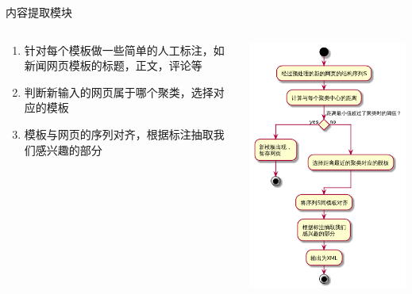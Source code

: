 \documentclass[presentation]{beamer}
\begin{document}
\begin{frame}[label=sec-2-23]{内容提取模块}
\begin{columns}
\begin{column}{0.55\textwidth}
\begin{enumerate}
\item 针对每个模板做一些简单的人工标注，如新闻网页模板的标题，正文，评论等
\item 判断新输入的网页属于哪个聚类，选择对应的模板
\item 模板与网页的序列对齐，根据标注抽取我们感兴趣的部分
\end{enumerate}

\end{column}

\begin{column}{0.4\textwidth}
\includegraphics[width=\textwidth]{./extractor.png}

\end{column}
\end{columns}
\end{frame}
\end{document}
